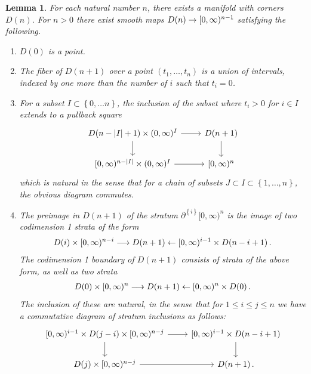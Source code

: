 \documentclass[10pt]{amsart}
\numberwithin{equation}{section}
\newtheorem{lem}[prop]{Lemma}
\theoremstyle{definition}
\newcommand{\del}{\partial}
\renewcommand{\to}{\mathchoice{\longrightarrow}{\rightarrow}{}{}}
\begin{document}
\begin{lem}\label{lem:conic_degeneracies}
	For each natural number $n$, there exists a manifold with corners $D(n)$. For $n>0$ there exist smooth maps $D(n) \to [0,\infty)^{n-1}$ satisfying the following.
	\begin{enumerate}
		\item $D(0)$ is a point.
		\item The fiber of $D(n+1)$ over a point $(t_{1},\dots, t_{n})$ is a union of intervals, indexed by one more than the number of $i$ such that $t_{i}=0$.
		\item For a subset $I\subset \left\{ 0, \dots n\right\}$, the inclusion of the subset where $t_{i} >0 $ for $i\in I$ extends to a pullback square
		\begin{equation*}
			\begin{tikzcd}
				{D(n-\vert I \vert + 1) \times (0,\infty)^{I} } \arrow[r] \arrow[d]      &   D(n+1)  \arrow[d] \\
				{[0,\infty)^{n-\vert I \vert} \times (0,\infty)^{I}  } \arrow[r]               &   {[0,\infty)^{n} }
			\end{tikzcd}
		\end{equation*}
		which is natural in the sense that for a chain of subsets $J\subset I \subset \left\{1,\dots, n\right\}$, the obvious diagram commutes.
		\item The preimage in $D(n+1)$ of the stratum $\del^{ \left\{ i \right\}} [0,\infty)^{n}$ is the image of two codimension 1 strata of the form
		\begin{align*}
			D(i) \times [0,\infty)^{n-i} \to D(n+1) \leftarrow [0,\infty)^{i-1}\times D(n-i+1) \,.
		\end{align*}
		The codimension 1 boundary of $D(n+1)$ consists of strata of the above form, as well as two strata
		\begin{align*}
			D(0) \times [0,\infty)^{n} \to D(n+1) \leftarrow [0,\infty)^{n} \times D(0) \,.
		\end{align*}
		The inclusion of these are natural, in the sense that for $1\leq i \leq j \leq n$ we have a commutative diagram of stratum inclusions as follows:
		\begin{equation*}
			\begin{tikzcd}
				{[0,\infty)^{i-1} \times D(j-i) \times [0,\infty)^{n-j} } \arrow[r] \arrow[d]      &   {[0,\infty)^{i-1} \times D(n-i+1)}  \arrow[d] \\
				{ D(j) \times [0,\infty)^{n-j} } \arrow[r]               &   D(n+1) \,.
			\end{tikzcd}
		\end{equation*}
	\end{enumerate}
\end{lem}
\end{document}

